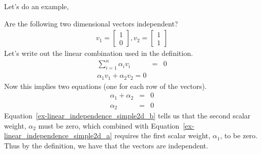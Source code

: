 Let's do an example,
\begin{example}
Are the following two dimensional vectors independent?
\begin{eqnarray}
v_1=\left[\begin{matrix}1\\0\end{matrix}\right], v_2=\left[\begin{matrix}1\\1\end{matrix}\right]
\end{eqnarray}
\Solution
Let's write out the linear combination used in the definition.
\begin{eqnarray}
\sum_{i=1}^n\alpha_iv_i&=&0\\
\alpha_1v_1+\alpha_2v_2=0
\end{eqnarray}
Now this implies two equations (one for each row of the vectors).
\begin{eqnarray}
\alpha_1+\alpha_2 &=& 0\label{ex-linear_independence_simple2d_a}\\
\alpha_2&=&0\label{ex-linear_independence_simple2d_b}
\end{eqnarray}
Equation~\ref{ex-linear_independence_simple2d_b} tells us that the second scalar weight, $\alpha_2$ must be zero, which combined with Equation~\ref{ex-linear_independence_simple2d_a} requires the first scalar weight, $\alpha_1$, to be zero.  Thus by the definition, we have that the vectors are independent.
\end{example}

